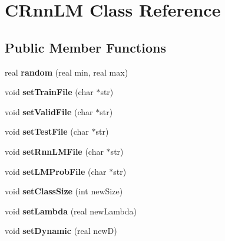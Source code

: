 \hypertarget{class_c_rnn_l_m}{}\section{C\+Rnn\+LM Class Reference}
\label{class_c_rnn_l_m}
\subsection*{Public Member Functions}
\begin{DoxyCompactItemize}
\item 
\mbox{\label{class_c_rnn_l_m_af171a2d00c380a420bc61191185f6f81}} 
real {\bfseries random} (real min, real max)
\item 
\mbox{\label{class_c_rnn_l_m_a3c65833d45dc29fddd95741311d3f8b5}} 
void {\bfseries set\+Train\+File} (char $\ast$str)
\item 
\mbox{\label{class_c_rnn_l_m_a845d9a04d0c9783308644ba1874a8cfd}} 
void {\bfseries set\+Valid\+File} (char $\ast$str)
\item 
\mbox{\label{class_c_rnn_l_m_a87394397b48e91a20d53ae1e98a5026d}} 
void {\bfseries set\+Test\+File} (char $\ast$str)
\item 
\mbox{\label{class_c_rnn_l_m_aa9d2c0a53ff437281dca20b694d72da0}} 
void {\bfseries set\+Rnn\+L\+M\+File} (char $\ast$str)
\item 
\mbox{\label{class_c_rnn_l_m_a43ff2e6771fdbc21d5beb89177b5e4e3}} 
void {\bfseries set\+L\+M\+Prob\+File} (char $\ast$str)
\item 
\mbox{\label{class_c_rnn_l_m_a51616292c6ad998df87c51d73494692d}} 
void {\bfseries set\+Class\+Size} (int new\+Size)
\item 
\mbox{\label{class_c_rnn_l_m_a4d1040988ed894e3238183263aa75758}} 
void {\bfseries set\+Lambda} (real new\+Lambda)
\item 
\mbox{\label{class_c_rnn_l_m_a211389ff5c8c960e99fd261ca31dc38a}} 
void {\bfseries set\+Dynamic} (real newD)
\item 

\end{DoxyCompactItemize}
